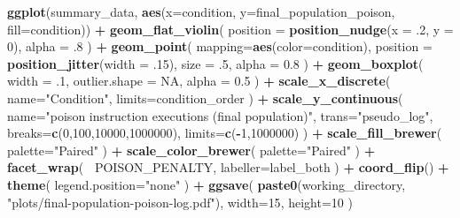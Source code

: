 \documentclass[]{book}
\newenvironment{Shaded}{\begin{snugshade}}{\end{snugshade}}
\newcommand{\DataTypeTok}[1]{\textcolor[rgb]{0.13,0.29,0.53}{#1}}
\newcommand{\DecValTok}[1]{\textcolor[rgb]{0.00,0.00,0.81}{#1}}
\newcommand{\FloatTok}[1]{\textcolor[rgb]{0.00,0.00,0.81}{#1}}
\newcommand{\KeywordTok}[1]{\textcolor[rgb]{0.13,0.29,0.53}{\textbf{#1}}}
\newcommand{\NormalTok}[1]{#1}
\newcommand{\OperatorTok}[1]{\textcolor[rgb]{0.81,0.36,0.00}{\textbf{#1}}}
\newcommand{\OtherTok}[1]{\textcolor[rgb]{0.56,0.35,0.01}{#1}}
\newcommand{\StringTok}[1]{\textcolor[rgb]{0.31,0.60,0.02}{#1}}
\begin{document}
\begin{Shaded}
\begin{Highlighting}[]
\KeywordTok{ggplot}\NormalTok{(summary_data, }\KeywordTok{aes}\NormalTok{(}\DataTypeTok{x=}\NormalTok{condition, }\DataTypeTok{y=}\NormalTok{final_population_poison, }\DataTypeTok{fill=}\NormalTok{condition)) }\OperatorTok{+}
\StringTok{  }\KeywordTok{geom_flat_violin}\NormalTok{(}
    \DataTypeTok{position =} \KeywordTok{position_nudge}\NormalTok{(}\DataTypeTok{x =} \FloatTok{.2}\NormalTok{, }\DataTypeTok{y =} \DecValTok{0}\NormalTok{),}
    \DataTypeTok{alpha =} \FloatTok{.8}
\NormalTok{  ) }\OperatorTok{+}
\StringTok{  }\KeywordTok{geom_point}\NormalTok{(}
    \DataTypeTok{mapping=}\KeywordTok{aes}\NormalTok{(}\DataTypeTok{color=}\NormalTok{condition),}
    \DataTypeTok{position =} \KeywordTok{position_jitter}\NormalTok{(}\DataTypeTok{width =} \FloatTok{.15}\NormalTok{),}
    \DataTypeTok{size =} \FloatTok{.5}\NormalTok{,}
    \DataTypeTok{alpha =} \FloatTok{0.8}
\NormalTok{  ) }\OperatorTok{+}
\StringTok{  }\KeywordTok{geom_boxplot}\NormalTok{(}
    \DataTypeTok{width =} \FloatTok{.1}\NormalTok{,}
    \DataTypeTok{outlier.shape =} \OtherTok{NA}\NormalTok{,}
    \DataTypeTok{alpha =} \FloatTok{0.5}
\NormalTok{  ) }\OperatorTok{+}
\StringTok{  }\KeywordTok{scale_x_discrete}\NormalTok{(}
    \DataTypeTok{name=}\StringTok{"Condition"}\NormalTok{,}
    \DataTypeTok{limits=}\NormalTok{condition_order}
\NormalTok{  ) }\OperatorTok{+}
\StringTok{  }\KeywordTok{scale_y_continuous}\NormalTok{(}
    \DataTypeTok{name=}\StringTok{"poison instruction executions (final population)"}\NormalTok{,}
    \DataTypeTok{trans=}\StringTok{"pseudo_log"}\NormalTok{,}
    \DataTypeTok{breaks=}\KeywordTok{c}\NormalTok{(}\DecValTok{0}\NormalTok{,}\DecValTok{100}\NormalTok{,}\DecValTok{10000}\NormalTok{,}\DecValTok{1000000}\NormalTok{),}
    \DataTypeTok{limits=}\KeywordTok{c}\NormalTok{(}\OperatorTok{-}\DecValTok{1}\NormalTok{,}\DecValTok{1000000}\NormalTok{)}
\NormalTok{  ) }\OperatorTok{+}
\StringTok{  }\KeywordTok{scale_fill_brewer}\NormalTok{(}
    \DataTypeTok{palette=}\StringTok{"Paired"}
\NormalTok{  ) }\OperatorTok{+}
\StringTok{  }\KeywordTok{scale_color_brewer}\NormalTok{(}
    \DataTypeTok{palette=}\StringTok{"Paired"}
\NormalTok{  ) }\OperatorTok{+}
\StringTok{  }\KeywordTok{facet_wrap}\NormalTok{(}
    \OperatorTok{~}\NormalTok{POISON_PENALTY,}
    \DataTypeTok{labeller=}\NormalTok{label_both}
\NormalTok{  ) }\OperatorTok{+}
\StringTok{  }\KeywordTok{coord_flip}\NormalTok{() }\OperatorTok{+}
\StringTok{  }\KeywordTok{theme}\NormalTok{(}
    \DataTypeTok{legend.position=}\StringTok{"none"}
\NormalTok{  ) }\OperatorTok{+}
\StringTok{  }\KeywordTok{ggsave}\NormalTok{(}
    \KeywordTok{paste0}\NormalTok{(working_directory, }\StringTok{"plots/final-population-poison-log.pdf"}\NormalTok{),}
    \DataTypeTok{width=}\DecValTok{15}\NormalTok{,}
    \DataTypeTok{height=}\DecValTok{10}
\NormalTok{  )}
\end{Highlighting}
\end{Shaded}
\end{document}
